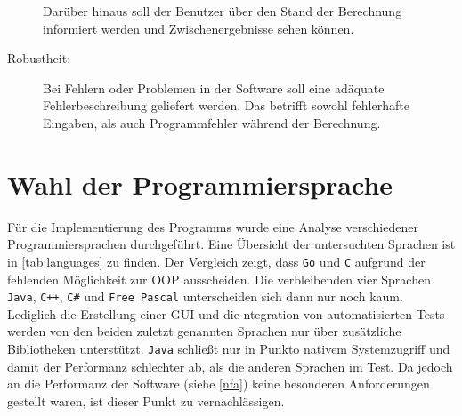 \begin{description}
    Darüber hinaus soll der Benutzer über den Stand der Berechnung informiert werden und Zwischenergebnisse sehen können. 
    
    \item[Robustheit:] Bei Fehlern oder Problemen in der Software soll eine adäquate Fehlerbeschreibung geliefert werden. Das betrifft sowohl fehlerhafte Eingaben, als auch Programmfehler während der Berechnung.
\end{description}




\section{Wahl der Programmiersprache}
\label{sec:language}
Für die Implementierung des Programms wurde eine Analyse verschiedener Programmiersprachen durchgeführt. Eine Übersicht der untersuchten Sprachen ist in \autoref{tab:languages} zu finden. Der Vergleich zeigt, dass \texttt{Go} und \texttt{C} aufgrund der fehlenden Möglichkeit zur \gls{OOP} ausscheiden. Die verbleibenden vier Sprachen \texttt{Java}, \texttt{C++}, \texttt{C\#}  und \texttt{Free Pascal} unterscheiden sich dann nur noch kaum. Lediglich die Erstellung einer \gls{GUI} und die ntegration von automatisierten Tests werden von den beiden zuletzt genannten Sprachen nur über zusätzliche Bibliotheken unterstützt. \texttt{Java} schließt nur in Punkto nativem Systemzugriff und damit der Performanz schlechter ab, als die anderen Sprachen im Test. Da jedoch an die Performanz der Software (siehe \autoref{nfa}) keine besonderen Anforderungen gestellt waren, ist dieser Punkt zu vernachlässigen. 

